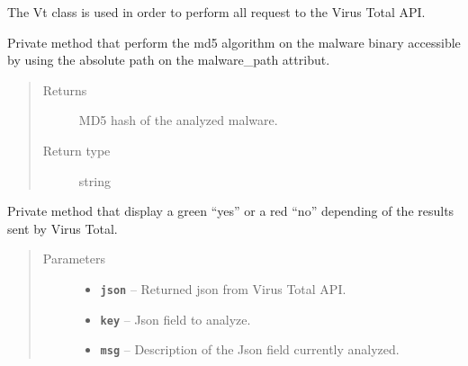 \documentclass[letterpaper,10pt,oneside]{sphinxmanual}
\begin{document}
\begin{fulllineitems}
\label{index:lib.vt.Vt}
The Vt class is used in order to perform all request to the
Virus Total API.

\begin{fulllineitems}
\label{index:lib.vt.Vt._Vt__malware_md5}
Private method that perform the md5 algorithm on the malware binary
accessible by using the absolute path on the malware\_path attribut.
\begin{quote}\begin{description}
\item[{Returns}] \leavevmode
MD5 hash of the analyzed malware.

\item[{Return type}] \leavevmode
string

\end{description}\end{quote}

\end{fulllineitems}


\begin{fulllineitems}
\label{index:lib.vt.Vt._Vt__print_ip_rslt}
Private method that display a green ``yes'' or a red ``no'' depending of
the results sent by Virus Total.
\begin{quote}\begin{description}
\item[{Parameters}] \leavevmode\begin{itemize}
\item {} 
\textbf{\texttt{json}} -- Returned json from Virus Total API.

\item {} 
\textbf{\texttt{key}} -- Json field to analyze.

\item {} 
\textbf{\texttt{msg}} -- Description of the Json field currently analyzed.

\end{itemize}

\end{description}\end{quote}


\end{fulllineitems}
\end{fulllineitems}
\end{document}
